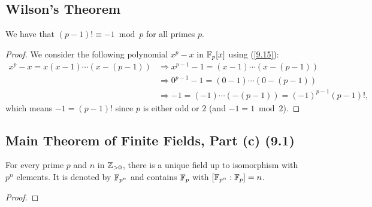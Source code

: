 \subsection{Wilson's Theorem}

We have that $(p - 1)! \equiv -1 \bmod p$ for all primes $p$.

\begin{proof}
    We consider the following polynomial $x^p - x$ in $\mathbb{F}_p[x]$ using
    (\ref{9.15}): \begin{align*}
        x^p - x = x(x - 1)\cdots(x - (p - 1))
        &\Longrightarrow x^{p - 1} - 1 = (x - 1)\cdots(x - (p - 1)) \\
        &\Longrightarrow 0^{p - 1} - 1 = (0 - 1)\cdots(0 - (p - 1)) \\
        &\Longrightarrow -1 = (-1)\cdots(-(p - 1)) = (-1)^{p - 1}(p - 1)!,
    \end{align*} which means $-1 = (p - 1)!$ since $p$ is either
    odd or $2$ (and $-1 = 1 \bmod 2$).
\end{proof}

\subsection{Main Theorem of Finite Fields, Part (c) (9.1)} \label{9.1c}

For every prime $p$ and $n$ in $\mathbb{Z}_{> 0}$, there is a unique field up to isomorphism
with $p^n$ elements. It is denoted by $\mathbb{F}_{p^n}$ and contains $\mathbb{F}_p$ with
$[\mathbb{F}_{p^n} : \mathbb{F}_p] = n$.

\begin{proof}
    
\end{proof}
